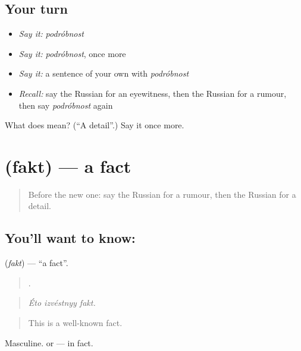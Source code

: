 \subsection*{Your turn}
\begin{itemize}
\raggedright
  \item \emph{Say it:} \emph{podróbnost}
  \item \emph{Say it:} \emph{podróbnost}, once more
  \item \emph{Say it:} a sentence of your own with \emph{podróbnost}
  \item \emph{Recall:} say the Russian for an eyewitness, then the Russian for a rumour, then say \emph{podróbnost} again
\end{itemize}

\begin{tcolorbox}[breakable,colback=teal!4,colframe=teal!35!black,title={Before you move on}]
What does  mean? (\textquotedblleft{}A detail\textquotedblright{}.) Say it once more.
\end{tcolorbox}
\section[\texorpdfstring{\ru{факт} (fakt)}{факт (fakt)}]{ (fakt) — a fact}

\label{lesson:RU-C282-fakt}



\begin{quote}
Before the new one: say the Russian for a rumour, then the Russian for a detail.
\end{quote}

\subsection*{You'll want to know: }
\textbf{} (\emph{fakt}) — \textquotedblleft{}a fact\textquotedblright{}.

\begin{quote}
  .
\end{quote}

\begin{quote}
\emph{Éto izvéstnyy fakt.}
\end{quote}

\begin{quote}
This is a well-known fact.
\end{quote}

Masculine. \emph{  } or \emph{} — in fact.

